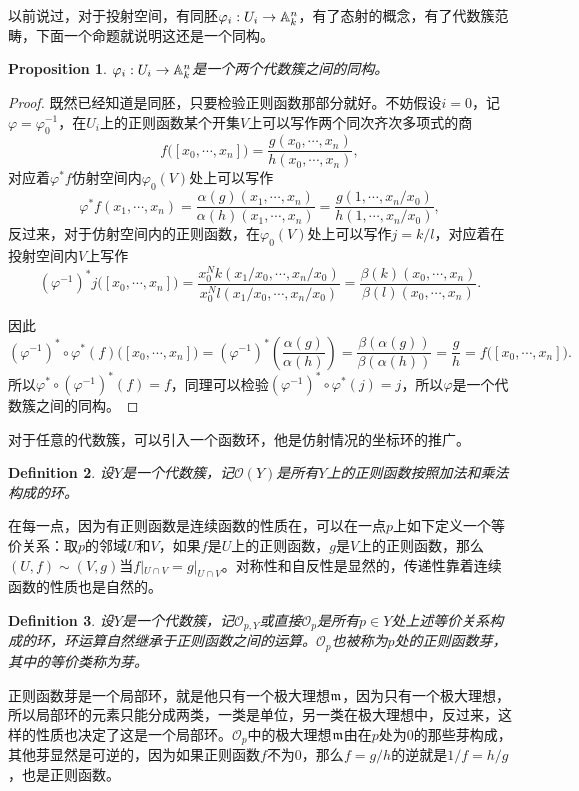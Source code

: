 \documentclass[9pt]{extarticle}
\theoremstyle{plain}%
\newtheorem{defi}{Definition}[section]%
\newtheorem{pro}[defi]{Proposition}%
\begin{document}
以前说过，对于投射空间，有同胚$\varphi_i:U_i\to \mathbb{A}^n_k$，有了态射的概念，有了代数簇范畴，下面一个命题就说明这还是一个同构。
\begin{pro}
	$\varphi_i:U_i\to \mathbb{A}^n_k$是一个两个代数簇之间的同构。
	\label{c3:p1}
\end{pro}
\begin{proof}
	既然已经知道是同胚，只要检验正则函数那部分就好。不妨假设$i=0$，记$\varphi=\varphi_0^{-1}$，在$U_i$上的正则函数某个开集$V$上可以写作两个同次齐次多项式的商
	\[
		f\bigl([x_0,\cdots,x_n]\bigr)=\frac{g(x_0,\cdots,x_n)}{h(x_0,\cdots,x_n)},
	\]
	对应着$\varphi^*f$仿射空间内$\varphi_0(V)$处上可以写作
	\[
		\varphi^*f(x_1,\cdots,x_n)=\frac{\alpha(g)(x_1,\cdots,x_n)}{\alpha(h)(x_1,\cdots,x_n)}=\frac{g(1,\cdots,x_n/x_0)}{h(1,\cdots,x_n/x_0)},
	\]
	反过来，对于仿射空间内的正则函数，在$\varphi_0(V)$处上可以写作$j=k/l$，对应着在投射空间内$V$上写作
	\[
		(\varphi^{-1})^*j\bigl([x_0,\cdots,x_n]\bigr)=\frac{x_0^Nk(x_1/x_0,\cdots,x_n/x_0)}{x_0^Nl(x_1/x_0,\cdots,x_n/x_0)}=\frac{\beta(k)(x_0,\cdots,x_n)}{\beta(l)(x_0,\cdots,x_n)}.
	\]

	因此
	\[
		(\varphi^{-1})^*\circ \varphi^*(f) \bigl([x_0,\cdots,x_n]\bigr)=(\varphi^{-1})^*\left(\frac{\alpha(g)}{\alpha(h)}\right)=\frac{\beta(\alpha(g))}{\beta(\alpha(h))}=\frac{g}{h}=f\bigl([x_0,\cdots,x_n]\bigr).
	\]
	所以$\varphi^*\circ(\varphi^{-1})^* (f)=f$，同理可以检验$(\varphi^{-1})^*\circ\varphi^* (j)=j$，所以$\varphi$是一个代数簇之间的同构。
\end{proof}

对于任意的代数簇，可以引入一个函数环，他是仿射情况的坐标环的推广。
\begin{defi}
	设$Y$是一个代数簇，记$\mathcal{O}(Y)$是所有$Y$上的正则函数按照加法和乘法构成的环。
\end{defi}
在每一点，因为有正则函数是连续函数的性质在，可以在一点$p$上如下定义一个等价关系：取$p$的邻域$U$和$V$，如果$f$是$U$上的正则函数，$g$是$V$上的正则函数，那么$(U,f)\sim (V,g)$当$f|_{U\cap V}=g|_{U\cap V}$。对称性和自反性是显然的，传递性靠着连续函数的性质也是自然的。
\begin{defi}
	设$Y$是一个代数簇，记$\mathcal{O}_{p,Y}$或直接$\mathcal{O}_{p}$是所有$p\in Y$处上述等价关系构成的环，环运算自然继承于正则函数之间的运算。$\mathcal{O}_{p}$也被称为$p$处的正则函数芽，其中的等价类称为芽。
\end{defi}
正则函数芽是一个局部环，就是他只有一个极大理想$\mathfrak{m}$，因为只有一个极大理想，所以局部环的元素只能分成两类，一类是单位，另一类在极大理想中，反过来，这样的性质也决定了这是一个局部环。$\mathcal{O}_{p}$中的极大理想$\mathfrak{m}$由在$p$处为$0$的那些芽构成，其他芽显然是可逆的，因为如果正则函数$f$不为0，那么$f=g/h$的逆就是$1/f=h/g$，也是正则函数。
\end{document}
